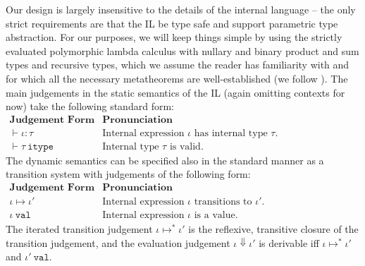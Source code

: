 

Our design is largely insensitive to the details of the internal language -- the only strict requirements are that the IL be type safe and support parametric type abstraction. For our purposes, we will keep things simple by using the strictly evaluated polymorphic lambda calculus with nullary and binary product and sum types and recursive types, which we assume the reader has familiarity with and for which all the necessary metatheorems are well-established (we follow \cite{pfpl}). The main judgements in the static semantics of the IL (again omitting contexts for now) take the following standard form:
\\[1ex]
$
\begin{array}{ll}
\textbf{Judgement Form} & \textbf{Pronunciation}\\
\vdash \iota : \tau & \text{Internal expression $\iota$ has internal type $\tau$.}\\
\vdash \tau~\mathtt{itype} & \text{Internal type $\tau$ is valid.}
\end{array}
$\\

\noindent
The dynamic semantics can be specified also in the standard manner as a transition system with  judgements of the following form:
\\[1ex]
$
\begin{array}{ll}
\textbf{Judgement Form} & \textbf{Pronunciation}\\
\iota \mapsto \iota' & \text{Internal expression $\iota$ transitions to $\iota'$.}\\
\iota~\mathtt{val} & \text{Internal expression $\iota$ is a value.}
\end{array}
$
\\[1ex]
The iterated transition judgement $\iota \mapsto^{*} \iota'$ is the reflexive, transitive closure of the transition judgement, and the evaluation judgement $\iota \Downarrow \iota'$ is derivable iff $\iota \mapsto^{*} \iota'$ and $\iota'~\mathtt{val}$.

